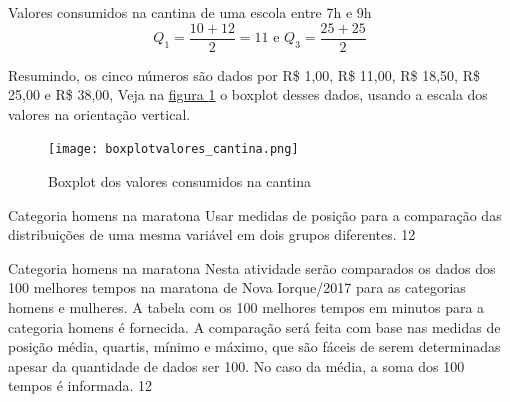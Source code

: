 \begin{example}{Valores consumidos na cantina de uma escola entre 7h e 9h}
\begin{equation*}
Q_1=\frac{10+12}{2}=11\text{ e }  Q_3=\frac{25+25}{2}
\end{equation*}

Resumindo, os cinco números são dados por R\$ 1,00, R\$ 11,00, R\$ 18,50, R\$ 25,00 e R\$ 38,00, Veja na \hyperref[boxplot-cantina]{figura \ref{boxplot-cantina}} o boxplot desses dados, usando a escala dos valores na orientação vertical.

\begin{figure}[H]
\centering

\texttt{[image: boxplotvalores\_cantina.png]}
\caption{Boxplot dos valores consumidos na cantina}
\label{boxplot-cantina}
\end{figure}

\end{example}
\clearpage
\def\currentcolor{session2}
\begin{objectives}{Categoria homens na maratona}
{
Usar medidas de posição para a comparação das distribuições de uma mesma variável em dois grupos diferentes.
}{1}{2}
\end{objectives}
\begin{sugestions}{Categoria homens na maratona}
{
Nesta atividade serão comparados os dados dos 100 melhores tempos na maratona de Nova Iorque/2017 para as categorias homens e mulheres. A tabela com os 100 melhores tempos em minutos para a categoria homens é fornecida. A comparação será feita com base nas medidas de posição média, quartis, mínimo e máximo, que são fáceis de serem determinadas apesar da quantidade de dados ser 100. No caso da média, a soma dos 100 tempos é informada.
}{1}{2}
\end{sugestions}
